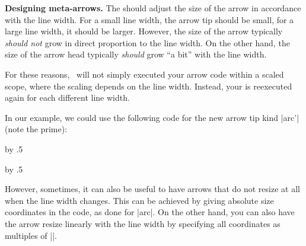 \begin{command}{\pgfarrowsdeclare{}}
  \medskip
  \textbf{Designing meta-arrows.}
  The  should adjust the size of the arrow in
  accordance with the line width. For a small line width, the arrow
  tip should be small, for a large line width, it should be
  larger. However, the size of the arrow typically \emph{should not}
  grow in direct proportion to the line width. On the other hand, the
  size of the arrow head typically \emph{should} grow ``a bit'' with
  the line width. 

  For these reasons, \pgfname\ will not simply executed your arrow
  code within a scaled scope, where the scaling depends on the line
  width. Instead, your  is reexecuted again for
  each different line width.

  In our example, we could use the following code for the new arrow
  tip kind |arc'| (note the prime):
\begin{codeexample}
\newdimen\arrowsize    
{}
{
  \arrowsize=0.2pt
  \advance\arrowsize by .5\pgflinewidth
  \pgfsetdash{}{0pt} %
  \pgfsetroundjoin   %
  \pgfsetroundcap    %
  \pgfpathmoveto{\pgfpoint{-4\arrowsize}{4\arrowsize}}
  \pgfusepathqstroke
}
\end{codeexample}
\newdimen\arrowsize    
{}
{
  \arrowsize=0.2pt
  \advance\arrowsize by .5\pgflinewidth
  \pgfsetdash{}{0pt} %
  \pgfsetroundjoin   %
  \pgfsetroundcap    %
  \pgfpathmoveto{\pgfpoint{-4\arrowsize}{4\arrowsize}}
  \pgfusepathqstroke
  \pgfpathmoveto{\pgfpointorigin}
  \pgfusepathqstroke
}
\begin{codeexample}[]
\end{codeexample}
  
  However, sometimes, it can also be useful to have arrows that do not
  resize at all when the line width changes. This can be achieved by
  giving absolute size coordinates in the code, as done for |arc|. On
  the other hand, you can also have the arrow resize linearly with the
  line width by specifying all coordinates as multiples of
  |\pgflinewidth|.


\end{command}

